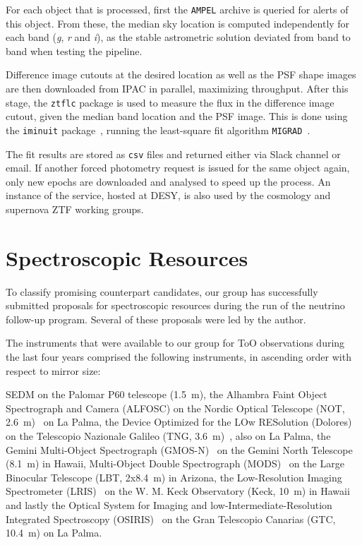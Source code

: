 For each object that is processed, first the \texttt{AMPEL} archive is queried for alerts of this object. From these, the median sky location is computed independently for each band (\textit{g}, \textit{r} and \textit{i}), as the stable astrometric solution deviated from band to band when testing the pipeline.

Difference image cutouts at the desired location as well as the PSF shape images are then downloaded from IPAC in parallel, maximizing throughput. After this stage, the \texttt{ztflc} package is used to measure the flux in the difference image cutout, given the median band location and the PSF image. This is done using the \texttt{iminuit} package~, running the least-square fit algorithm \texttt{MIGRAD}~.

The fit results are stored as \texttt{csv} files and returned either via Slack channel or email. If another forced photometry request is issued for the same object again, only new epochs are downloaded and analysed to speed up the process. An instance of the service, hosted at DESY, is also used by the cosmology and supernova ZTF working groups.

\section{Spectroscopic Resources}\label{spec_resources}
To classify promising counterpart candidates, our group has successfully submitted proposals for spectroscopic resources during the run of the neutrino follow-up program. Several of these proposals were led by the author.

The instruments that were available to our group for ToO observations during the last four years comprised the following instruments, in ascending order with respect to mirror size:

SEDM on the Palomar P60 telescope (\SI{1.5}{\meter}), the Alhambra Faint Object Spectrograph and Camera (ALFOSC) on the Nordic Optical Telescope (NOT, \SI{2.6}{\meter})~ on La Palma, the Device Optimized for the LOw RESolution (Dolores) on the Telescopio Nazionale Galileo (TNG, \SI{3.6}{\meter})~, also on La Palma, the Gemini Multi-Object Spectrograph (GMOS-N)~ on the Gemini North Telescope (\SI{8.1}{\meter}) in Hawaii, Multi-Object Double Spectrograph (MODS)~ on the Large Binocular Telescope (LBT, 2x\SI{8.4}{\meter}) in Arizona, the Low-Resolution Imaging Spectrometer (LRIS)~ on the W. M. Keck Observatory (Keck, \SI{10}{\meter}) in Hawaii and lastly the Optical System for Imaging and low-Intermediate-Resolution Integrated Spectroscopy (OSIRIS)~ on the Gran Telescopio Canarias (GTC, \SI{10.4}{\meter}) on La Palma.

